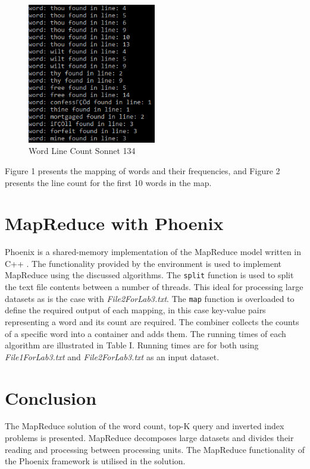 \documentclass[a4paper, 11pt, onecolumn, conference]{IEEEtran}      %
\begin{document}
\begin{figure}
    \centering
    \includegraphics[width = 0.5\textwidth, height = 0.5\textwidth]{outputDemon2.png}
    \caption{Word Line Count Sonnet 134}
    \label{fig:SonnetLine}
\end{figure}
Figure 1 presents the mapping of words and their frequencies, and Figure 2 presents the line count for the first 10 words in the map.
\section{MapReduce with Phoenix}
Phoenix is a shared-memory implementation of the MapReduce model written in C++ \cite{mapreduce}. The functionality provided by the environment is used to implement MapReduce using the discussed algorithms. The \texttt{split} function is used to split the text file contents between a number of threads. This ideal for processing large datasets as is the case with \textit{File2ForLab3.txt}. The \texttt{map} function is overloaded to define the required output of each mapping, in this case key-value pairs representing a word and its count are required. The combiner collects the counts of a specific word into a container and adds them. The running times of each algorithm are illustrated in Table I. Running times are for both using \textit{File1ForLab3.txt} and \textit{File2ForLab3.txt} as an input dataset. 

\section{Conclusion}
The MapReduce solution of the word count, top-K query and inverted index problems is presented. MapReduce decomposes large datasets and divides their reading and processing between processing units. The MapReduce functionality of the Phoenix framework is utilised in the solution. 

 


\end{document}
